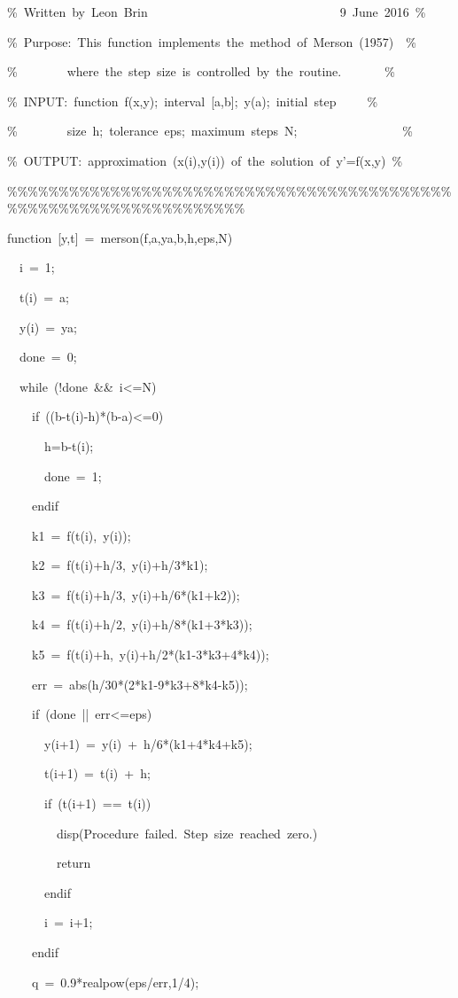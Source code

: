 \begin{description}
\begin{lyxcode}
\%~Written~by~Leon~Brin~~~~~~~~~~~~~~~~~~~~~~~~~~~~~~~9~June~2016~\%

\%~Purpose:~This~function~implements~the~method~of~Merson~(1957)~~\%

\%~~~~~~~~where~the~step~size~is~controlled~by~the~routine.~~~~~~~\%

\%~INPUT:~function~f(x,y);~interval~{[}a,b{]};~y(a);~initial~step~~~~~\%

\%~~~~~~~~size~h;~tolerance~eps;~maximum~steps~N;~~~~~~~~~~~~~~~~~\%

\%~OUTPUT:~approximation~(x(i),y(i))~of~the~solution~of~y'=f(x,y)~\%

\%\%\%\%\%\%\%\%\%\%\%\%\%\%\%\%\%\%\%\%\%\%\%\%\%\%\%\%\%\%\%\%\%\%\%\%\%\%\%\%\%\%\%\%\%\%\%\%\%\%\%\%\%\%\%\%\%\%\%\%\%\%\%\%\%\%

function~{[}y,t{]}~=~merson(f,a,ya,b,h,eps,N)

~~i~=~1;

~~t(i)~=~a;

~~y(i)~=~ya;

~~done~=~0;

~~while~(!done~\&\&~i<=N)

~~~~if~((b-t(i)-h){*}(b-a)<=0)

~~~~~~h=b-t(i);

~~~~~~done~=~1;

~~~~endif

~~~~k1~=~f(t(i),~y(i));

~~~~k2~=~f(t(i)+h/3,~y(i)+h/3{*}k1);

~~~~k3~=~f(t(i)+h/3,~y(i)+h/6{*}(k1+k2));

~~~~k4~=~f(t(i)+h/2,~y(i)+h/8{*}(k1+3{*}k3));

~~~~k5~=~f(t(i)+h,~y(i)+h/2{*}(k1-3{*}k3+4{*}k4));

~~~~err~=~abs(h/30{*}(2{*}k1-9{*}k3+8{*}k4-k5));

~~~~if~(done~||~err<=eps)

~~~~~~y(i+1)~=~y(i)~+~h/6{*}(k1+4{*}k4+k5);

~~~~~~t(i+1)~=~t(i)~+~h;

~~~~~~if~(t(i+1)~==~t(i))

~~~~~~~~disp(\textquotedbl Procedure~failed.~Step~size~reached~zero.\textquotedbl )

~~~~~~~~return

~~~~~~endif

~~~~~~i~=~i+1;

~~~~endif

~~~~q~=~0.9{*}realpow(eps/err,1/4);


\end{lyxcode}
\end{description}
